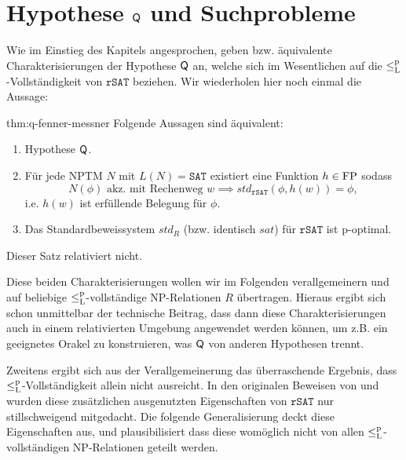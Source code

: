 \section{Hypothese $\mathsf{Q}$ und Suchprobleme}\label{sec:q-vs-search}

Wie im Einstieg des Kapitels angesprochen, geben \textcite{fenner_inverting_2003} bzw. \textcite{messner_simulation_2001} äquivalente Charakterisierungen der Hypothese $\mathsf{Q}$ an, welche sich im Wesentlichen auf die $\leq_\mathrm{L}^\mathrm{p}$-Vollständigkeit von $\mathtt{rSAT}$ beziehen.
Wir wiederholen hier noch einmal die Aussage:
\begin{reptheorem}{thm:q-fenner-messner}
    Folgende Aussagen sind äquivalent:
    \begin{enumerate}
        \item Hypothese $\mathsf{Q}$.
        \item Für jede NPTM $N$ mit $L(N)=\mathtt{SAT}$ existiert eine Funktion $h\in \mathrm{FP}$ sodass 
        \[ N(\phi) \text{ akz. mit Rechenweg $w$} \implies \mathit{std}_{\mathtt{rSAT}}(\phi,h(w))=\phi, \]
        i.e. $h(w)$ ist erfüllende Belegung für $\phi$.
        \item Das Standardbeweissystem $\mathit{std}_R$ (bzw. identisch $\mathit{sat}$)
            für $\mathtt{rSAT}$ ist p-optimal.
    \end{enumerate}
    Dieser Satz relativiert nicht.
\end{reptheorem}

Diese beiden Charakterisierungen wollen wir im Folgenden verallgemeinern und auf beliebige $\leq_\mathrm{L}^\mathrm{p}$-vollständige NP-Relationen $R$ übertragen. 
Hieraus ergibt sich schon unmittelbar der technische Beitrag, dass dann diese Charakterisierungen auch in einem relativierten Umgebung angewendet werden können, um z.B. ein geeignetes Orakel zu konstruieren, was $\mathsf{Q}$ von anderen Hypothesen trennt.

Zweitens ergibt sich aus der Verallgemeinerung das überraschende Ergebnis, dass $\leq_\mathrm{L}^\mathrm{p}$-Vollständigkeit allein nicht ausreicht. In den originalen Beweisen von \citeauthor{fenner_inverting_2003} und \citeauthor{messner_simulation_2001} wurden diese zusätzlichen ausgenutzten Eigenschaften von $\mathtt{rSAT}$ nur stillschweigend mitgedacht. Die folgende Generalisierung deckt diese Eigenschaften aus, und plausibilisiert dass diese womöglich nicht von allen $\leq_\mathrm{L}^\mathrm{p}$-vollständigen NP-Relationen geteilt werden.

